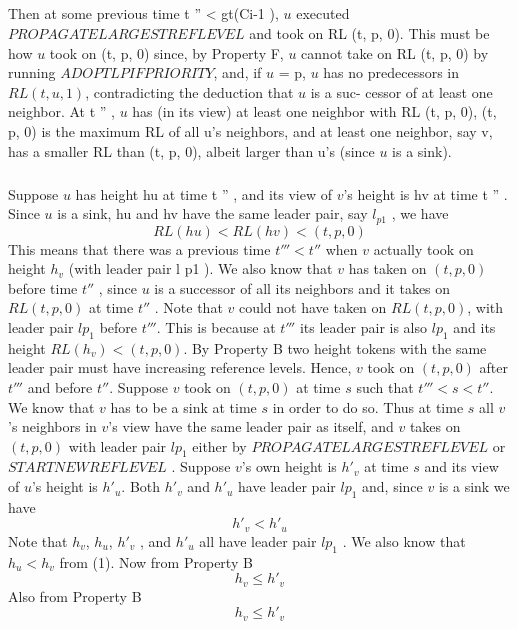 \subparagraph{}Then at some previous time t '' < gt(Ci-1 ), $u$ executed $PROPAGATELARGESTREFLEVEL$ and took on RL (t, p, 0). This must be how $u$ took on (t, p, 0) since, by Property F, $u$ cannot take on RL (t, p, 0) by running $ADOPTLPIFPRIORITY$, and, if $u$ = p, $u$ has no predecessors in $RL (t, u, 1)$, contradicting the deduction that $u$ is a suc- cessor of at least one neighbor. At t '' , $u$ has (in its view) at least one neighbor with RL (t, p, 0), (t, p, 0) is the maximum RL of all u's neighbors, and at least one neighbor, say v, has a smaller RL than (t, p, 0), albeit larger than u's (since $u$ is a sink).
\subparagraph{}Suppose $u$ has height hu at time t '' , and its view of $v$'s height is hv at time t '' . Since $u$ is a sink, hu and hv have the same leader pair, say $l_{p1}$ , we have
\begin{equation}
RL(hu ) < RL(hv ) < (t, p, 0)
\end{equation}
This means that there was a previous time $t ''' < t ''$ when $v$ actually took on height $h_v$ (with leader pair l p1 ). We also know that $v$ has taken on $(t, p, 0)$ before time $t ''$ , since $u$ is a successor of all its neighbors and it takes on $RL (t, p, 0)$ at time $t ''$ . Note that $v$ could not have taken on $RL (t, p, 0)$, with leader pair $lp_1$ before $t '''$. This is because at $t '''$ its leader pair is also $lp_1$ and its height $RL(h_v ) < (t, p, 0)$. By Property B two height tokens with the same leader pair must have increasing reference levels. Hence, $v$ took on $(t, p, 0)$ after $t '''$ and before $t ''$. Suppose $v$ took on $(t, p, 0)$ at time $s$ such that $t ''' < s < t ''$. We know that $v$ has to be a sink at time $s$ in order to do so. Thus at time $s$ all $v$'s neighbors in $v$'s view have the same leader pair as itself, and $v$ takes on $(t, p, 0)$ with leader pair $lp_1$ either by $PROPAGATELARGESTREFLEVEL$ or $STARTNEWREFLEVEL$ . Suppose $v$'s own height is $h'_v$ at time $s$ and its view of $u$'s height is $h'_u$. Both $h'_v$ and $h'_u$ have leader pair $lp_1$ and, since $v$ is a sink we have
\begin{equation}
h'_v < h'_u
\end{equation}
Note that $h_v$, $h_u$, $h'_v$ , and $h'_u$ all have leader pair $lp_1$ . We also know that $h_u < h_v$ from (1). Now from Property B
\begin{equation}
h_v \leq h'_v
\end{equation}
Also from Property B
\begin{equation}
h_v \leq h'_v
\end{equation}
